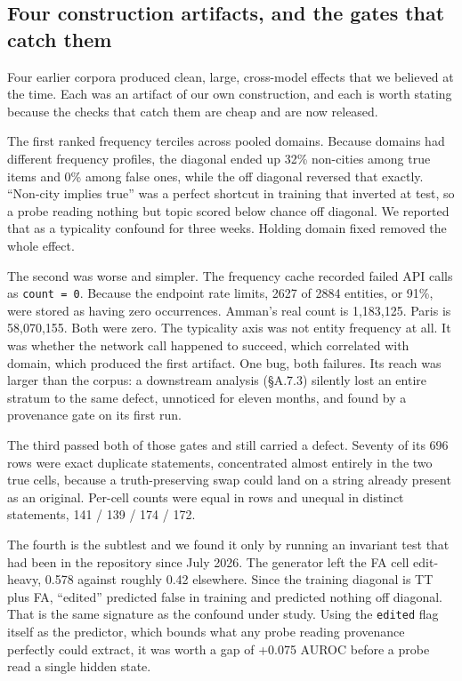 \documentclass[10pt]{article}
\begin{document}
\subsection{Four construction artifacts, and the gates that catch them}

Four earlier corpora produced clean, large, cross-model effects that we believed at the time. Each was an artifact of our own construction, and each is worth stating because the checks that catch them are cheap and are now released.

The first ranked frequency terciles across pooled domains. Because domains had different frequency profiles, the diagonal ended up 32\% non-cities among true items and 0\% among false ones, while the off diagonal reversed that exactly. ``Non-city implies true'' was a perfect shortcut in training that inverted at test, so a probe reading nothing but topic scored below chance off diagonal. We reported that as a typicality confound for three weeks. Holding domain fixed removed the whole effect.

The second was worse and simpler. The frequency cache recorded failed API calls as \texttt{count = 0}. Because the endpoint rate limits, 2627 of 2884 entities, or 91\%, were stored as having zero occurrences. Amman's real count is 1,183,125. Paris is 58,070,155. Both were zero. The typicality axis was not entity frequency at all. It was whether the network call happened to succeed, which correlated with domain, which produced the first artifact. One bug, both failures. Its reach was larger than the corpus: a downstream analysis (§A.7.3) silently lost an entire stratum to the same defect, unnoticed for eleven months, and found by a provenance gate on its first run.

The third passed both of those gates and still carried a defect. Seventy of its 696 rows were exact duplicate statements, concentrated almost entirely in the two true cells, because a truth-preserving swap could land on a string already present as an original. Per-cell counts were equal in rows and unequal in distinct statements, 141 / 139 / 174 / 172.

The fourth is the subtlest and we found it only by running an invariant test that had been in the repository since July 2026. The generator left the FA cell edit-heavy, 0.578 against roughly 0.42 elsewhere. Since the training diagonal is TT plus FA, ``edited'' predicted false in training and predicted nothing off diagonal. That is the same signature as the confound under study. Using the \texttt{edited} flag itself as the predictor, which bounds what any probe reading provenance perfectly could extract, it was worth a gap of +0.075 AUROC before a probe read a single hidden state.
\end{document}
